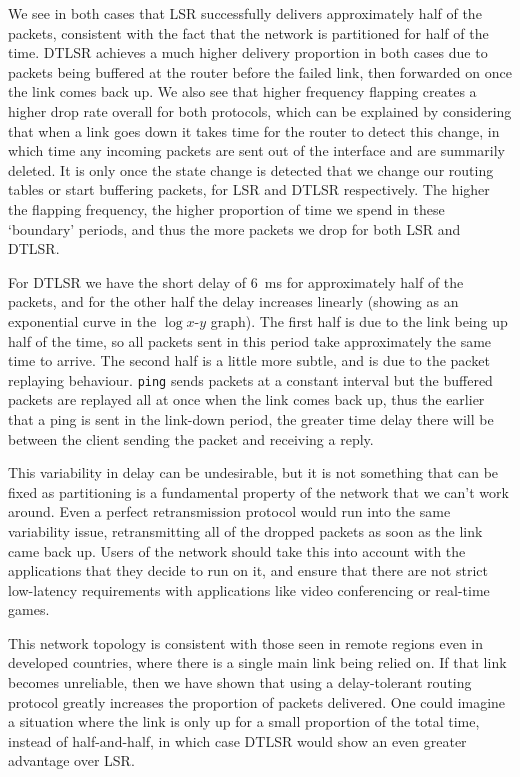 \documentclass[withindex,glossary,openany]{cam-thesis}
\begin{document}
We see in both cases that LSR successfully delivers approximately half of the packets, consistent with the fact that the network is partitioned for half of the time. DTLSR achieves a much higher delivery proportion in both cases due to packets being buffered at the router before the failed link, then forwarded on once the link comes back up. We also see that higher frequency flapping creates a higher drop rate overall for both protocols, which can be explained by considering that when a link goes down it takes time for the router to detect this change, in which time any incoming packets are sent out of the interface and are summarily deleted. It is only once the state change is detected that we change our routing tables or start buffering packets, for LSR and DTLSR respectively. The higher the flapping frequency, the higher proportion of time we spend in these `boundary' periods, and thus the more packets we drop for both LSR and DTLSR.

For DTLSR we have the short delay of \SI{6}{\ms} for approximately half of the packets, and for the other half the delay increases linearly (showing as an exponential curve in the $\log x$-$y$ graph). The first half is due to the link being up half of the time, so all packets sent in this period take approximately the same time to arrive. The second half is a little more subtle, and is due to the packet replaying behaviour. \texttt{ping} sends packets at a constant interval but the buffered packets are replayed all at once when the link comes back up, thus the earlier that a ping is sent in the link-down period, the greater time delay there will be between the client sending the packet and receiving a reply.

This variability in delay can be undesirable, but it is not something that can be fixed as partitioning is a fundamental property of the network that we can't work around. Even a perfect retransmission protocol would run into the same variability issue, retransmitting all of the dropped packets as soon as the link came back up. Users of the network should take this into account with the applications that they decide to run on it, and ensure that there are not strict low-latency requirements with applications like video conferencing or real-time games.

This network topology is consistent with those seen in remote regions even in developed countries, where there is a single main link being relied on. If that link becomes unreliable, then we have shown that using a delay-tolerant routing protocol greatly increases the proportion of packets delivered. One could imagine a situation where the link is only up for a small proportion of the total time, instead of half-and-half, in which case DTLSR would show an even greater advantage over LSR.
\end{document}
